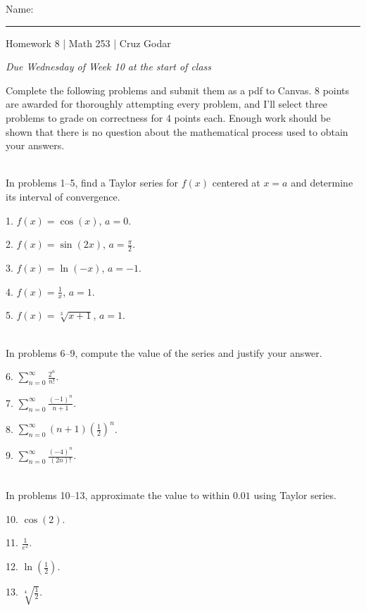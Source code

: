\documentclass{article}
\begin{document}
\Large Name: \rule{2in}{0.15mm} \hfill Homework 8 | Math 253 | Cruz Godar \vspace{4pt} \normalsize

\textit{Due Wednesday of Week 10 at the start of class}

Complete the following problems and submit them as a pdf to Canvas. 8 points are awarded for thoroughly attempting every problem, and I'll select three problems to grade on correctness for 4 points each. Enough work should be shown that there is no question about the mathematical process used to obtain your answers.

~\\

In problems 1--5, find a Taylor series for $f(x)$ centered at $x = a$ and determine its interval of convergence.

1. $\displaystyle f(x) = \cos(x)$, $\displaystyle a = 0$.

2. $\displaystyle f(x) = \sin(2x)$, $\displaystyle a = \frac{\pi}{2}$.

3. $\displaystyle f(x) = \ln(-x)$, $\displaystyle a = -1$.

4. $\displaystyle f(x) = \frac{1}{x}$, $\displaystyle a = 1$.

5. $\displaystyle f(x) = \sqrt[3]{x + 1}$, $\displaystyle a = 1$.

~\\

In problems 6--9, compute the value of the series and justify your answer.

6. $\displaystyle \sum_{n = 0}^\infty \frac{2^n}{n!}$.

7. $\displaystyle \sum_{n = 0}^\infty \frac{(-1)^n}{n + 1}$.

8. $\displaystyle \sum_{n = 0}^\infty (n + 1)\left( \frac{1}{2} \right)^n$.

9. $\displaystyle \sum_{n = 0}^\infty \frac{(-4)^n}{(2n)!}$.

~\\

In problems 10--13, approximate the value to within $0.01$ using Taylor series. 

10. $\displaystyle \cos(2)$.

11. $\displaystyle \frac{1}{e^2}$.

12. $\displaystyle \ln\left( \frac{1}{2} \right)$.

13. $\displaystyle \sqrt[4]{\frac{1}{2}}$.

~\\
\end{document}
